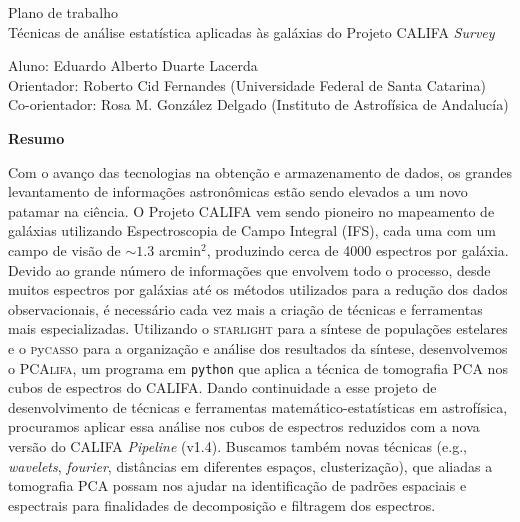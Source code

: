 \documentclass[a4paper,12pt]{article}
\newcommand\pycasso{\textsc{p}y\textsc{casso}\xspace}
\newcommand\pcalifa{PCA\textsc{lifa}\xspace}
\def\starlight{\textsc{starlight}\xspace}      %
\begin{document}
\begin{center}
	\LARGE{Plano de trabalho}\\ \bigskip\large{Técnicas de análise estatística aplicadas às galáxias do Projeto CALIFA {\em Survey}}
\end{center}

\vspace{1cm}

\begin{flushleft}
	Aluno: Eduardo Alberto Duarte Lacerda\\
	Orientador: Roberto Cid Fernandes (Universidade Federal de Santa Catarina)\\
	Co-orientador: Rosa M. González Delgado (Instituto de Astrofísica de Andalucía)
\end{flushleft}

\begin{center}
	\textbf{Resumo}
\end{center}
Com o avanço das tecnologias na obtenção e armazenamento de dados, os grandes levantamento de informações astronômicas estão sendo elevados a um novo
patamar na ciência. O Projeto CALIFA vem sendo pioneiro no mapeamento de galáxias utilizando Espectroscopia de Campo Integral (IFS), cada uma com um
campo de visão de $\sim1.3$ arcmin${}^2$, produzindo cerca de 4000 espectros por galáxia. Devido ao grande número de informações que envolvem todo o
processo, desde muitos espectros por galáxias até os métodos utilizados para a redução dos dados observacionais, é necessário cada vez mais a criação
de técnicas e ferramentas mais especializadas. Utilizando o \starlight para a síntese de populações estelares e o \pycasso para a organização e
análise dos resultados da síntese, desenvolvemos o \pcalifa, um programa em \texttt{python} que aplica a técnica de tomografia PCA nos cubos de
espectros do CALIFA. Dando continuidade a esse projeto de desenvolvimento de técnicas e ferramentas matemático-estatísticas em astrofísica, procuramos
aplicar essa análise nos cubos de espectros reduzidos com a nova versão do CALIFA {\em Pipeline} (v1.4). Buscamos também novas técnicas (e.g., {\em
wavelets}, {\em fourier}, distâncias em diferentes espaços, clusterização), que aliadas a tomografia PCA possam nos ajudar na identificação de padrões
espaciais e espectrais para finalidades de decomposição e filtragem dos espectros.
	
\end{document}
